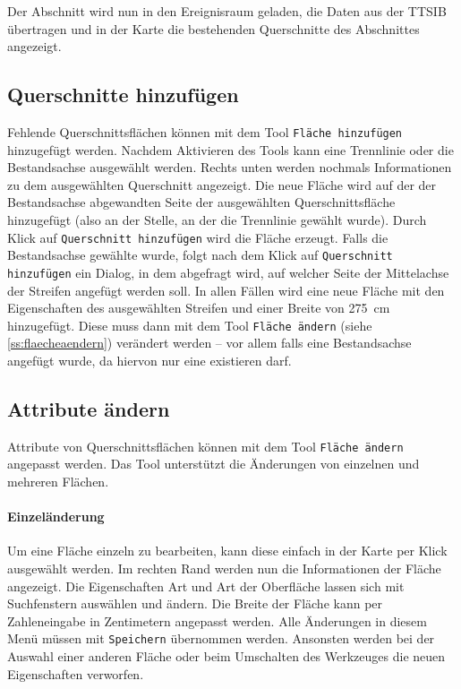 \documentclass[a4paper,11pt,bibliography=totoc, listof=totoc,titlepage]{scrartcl}
\begin{document}
Der Abschnitt wird nun in den Ereignisraum geladen, die Daten aus der TTSIB übertragen und in der Karte die bestehenden \Gls{Querschnitt}e des Abschnittes angezeigt.

\subsection{Querschnitte hinzufügen}
Fehlende \Gls{Querschnitt}sflächen können mit dem Tool \verb|Fläche hinzufügen| hinzugefügt werden. Nachdem Aktivieren des Tools kann eine Trennlinie oder die Bestandsachse ausgewählt werden. Rechts unten werden nochmals Informationen zu dem ausgewählten \Gls{Querschnitt} angezeigt. Die neue Fläche wird auf der der Bestandsachse abgewandten Seite der ausgewählten \Gls{Querschnitt}sfläche hinzugefügt (also an der Stelle, an der die Trennlinie gewählt wurde). Durch Klick auf \verb|Querschnitt hinzufügen| wird die Fläche erzeugt. Falls die Bestandsachse gewählte wurde, folgt nach dem Klick auf \verb|Querschnitt hinzufügen| ein Dialog, in dem abgefragt wird, auf welcher Seite der Mittelachse der Streifen angefügt werden soll. In allen Fällen wird eine neue Fläche mit den Eigenschaften des ausgewählten Streifen und einer Breite von 275~cm hinzugefügt. Diese muss dann mit dem Tool \verb|Fläche ändern| (siehe \autoref{ss:flaecheaendern}) verändert werden -- vor allem falls eine Bestandsachse angefügt wurde, da hiervon nur eine existieren darf.

\subsection{Attribute ändern}
\label{ss:flaecheaendern}
Attribute von \Gls{Querschnitt}sflächen können mit dem Tool \verb|Fläche ändern| angepasst werden. Das Tool unterstützt die Änderungen von einzelnen und mehreren Flächen.

\paragraph{Einzeländerung}
\label{p:flaecheeinzeln}
Um eine Fläche einzeln zu bearbeiten, kann diese einfach in der Karte per Klick ausgewählt werden. Im rechten Rand werden nun die Informationen der Fläche angezeigt. Die Eigenschaften Art und Art der Oberfläche lassen sich mit \Gls{Suchfenster}n auswählen und ändern. Die Breite der Fläche kann per Zahleneingabe in Zentimetern angepasst werden. Alle Änderungen in diesem Menü müssen mit \verb|Speichern| übernommen werden. Ansonsten werden bei der Auswahl einer anderen Fläche oder beim Umschalten des Werkzeuges die neuen Eigenschaften verworfen.
\end{document}
